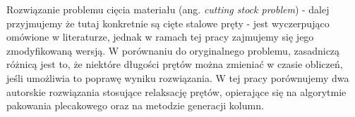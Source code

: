 Rozwiązanie problemu cięcia materiału (ang. \textit{cutting stock problem}) - dalej przyjmujemy że tutaj konkretnie są cięte stalowe pręty - jest wyczerpująco omówione w literaturze, jednak w ramach tej pracy zajmujemy się jego zmodyfikowaną wersją. W porównaniu do oryginalnego problemu, zasadniczą różnicą jest to, że niektóre długości prętów można zmieniać w czasie obliczeń, jeśli umożliwia to poprawę wyniku rozwiązania. W tej pracy porównujemy dwa autorskie rozwiązania stosujące relaksację prętów, opierające się na algorytmie pakowania plecakowego oraz na metodzie generacji kolumn.